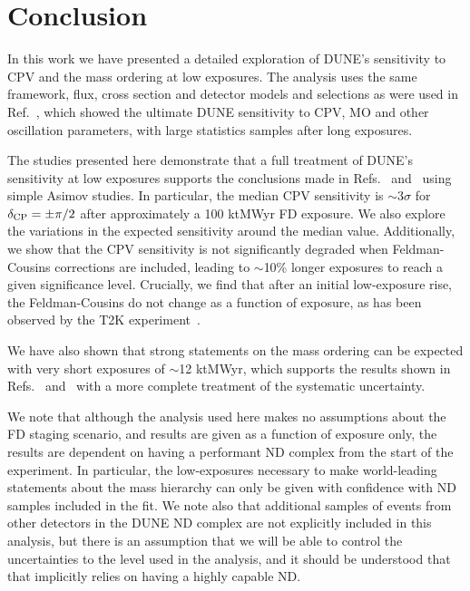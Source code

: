 \section{Conclusion}
\label{sec:conclude}

In this work we have presented a detailed exploration of DUNE's sensitivity to CPV and the mass ordering at low exposures. The analysis uses the same framework, flux, cross section and detector models and selections as were used in Ref.~\cite{Abi:2020qib}, which showed the ultimate DUNE sensitivity to CPV, MO and other oscillation parameters, with large statistics samples after long exposures.


The studies presented here demonstrate that a full treatment of DUNE's sensitivity at low exposures supports the conclusions made in Refs.~\cite{Abi:2020qib} and~\cite{Abi:2020evt} using simple Asimov studies. In particular, the median CPV sensitivity is $\sim$3$\sigma$ for $\delta_{\rm CP} = \pm\pi/2$ after approximately a 100 ktMWyr FD exposure. We also explore the variations in the expected sensitivity around the median value. Additionally, we show that the CPV sensitivity is not significantly degraded when Feldman-Cousins corrections are included, leading to $\sim$10\% longer exposures to reach a given significance level. Crucially, we find that after an initial low-exposure rise, the Feldman-Cousins \dchisqcrit do not change as a function of exposure, as has been observed by the T2K experiment~\cite{Abe:2021gky}.

We have also shown that strong statements on the mass ordering can be expected with very short exposures of $\sim$12 ktMWyr, which supports the results shown in Refs.~\cite{Abi:2020qib} and~\cite{Abi:2020evt} with a more complete treatment of the systematic uncertainty.

We note that although the analysis used here makes no assumptions about the FD staging scenario, and results are given as a function of exposure only, the results are dependent on having a performant ND complex from the start of the experiment. In particular, the low-exposures necessary to make world-leading statements about the mass hierarchy can only be given with confidence with ND samples included in the fit. We note also that additional samples of events from other detectors in the DUNE ND complex are not explicitly included in this analysis, but there is an assumption that we will be able to control the uncertainties to the level used in the analysis, and it should be understood that that implicitly relies on having a highly capable ND.
